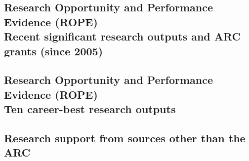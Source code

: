 \documentclass[a4paper,fontsize=12pt]{scrartcl}
\begin{document}
\newpage
\setcounter{section}{6}
\setcounter{subsection}{11} %
\subsection{Research Opportunity and Performance Evidence (ROPE)\\
  Recent significant research outputs and ARC grants (since 2005)}
\label{sec:recent-significant-outputs}



\newpage
\subsection{Research Opportunity and Performance Evidence (ROPE)\\
  Ten career-best research outputs}
\label{sec:ten-best-outputs}



\newpage
\setcounter{section}{7} %
\setcounter{subsection}{0}
\subsection{Research support from sources other than the ARC}
\label{sec:other-research-support}



\printbibliography[title=References]
\end{document}

